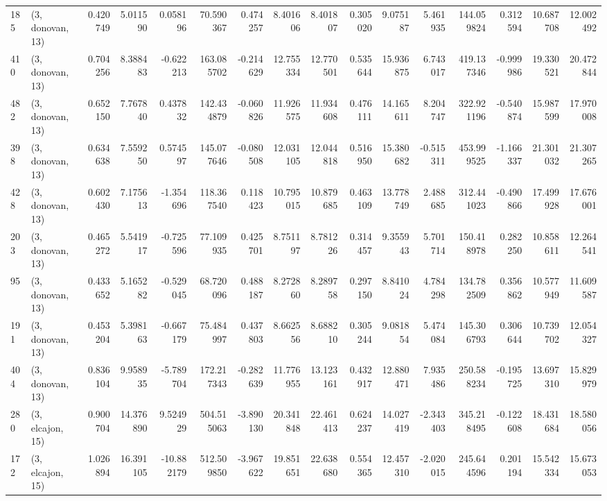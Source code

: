 \begin{tabular}{llrrrrrrrrrrrrrr}
185 &  (3, donovan, 13) &   0.420749 &   5.011590 &   0.058196 &    70.590367 &   0.474257 &   8.401606 &   8.401807 &  0.305020 &   9.075187 &   5.461935 &   144.059824 &  0.312594 &  10.687708 &  12.002492 \\
410 &  (3, donovan, 13) &   0.704256 &   8.388483 &  -0.622213 &   163.085702 &  -0.214629 &  12.755334 &  12.770501 &  0.535644 &  15.936875 &   6.743017 &   419.137346 & -0.999986 &  19.330521 &  20.472844 \\
482 &  (3, donovan, 13) &   0.652150 &   7.767840 &   0.437832 &   142.434879 &  -0.060826 &  11.926575 &  11.934608 &  0.476111 &  14.165611 &   8.204747 &   322.921196 & -0.540874 &  15.987599 &  17.970008 \\
398 &  (3, donovan, 13) &   0.634638 &   7.559250 &   0.574597 &   145.077646 &  -0.080508 &  12.031105 &  12.044818 &  0.516950 &  15.380682 &  -0.515311 &   453.999525 & -1.166337 &  21.301032 &  21.307265 \\
428 &  (3, donovan, 13) &   0.602430 &   7.175613 &  -1.354696 &   118.367540 &   0.118423 &  10.795015 &  10.879685 &  0.463109 &  13.778749 &   2.488685 &   312.441023 & -0.490866 &  17.499928 &  17.676001 \\
203 &  (3, donovan, 13) &   0.465272 &   5.541917 &  -0.725596 &    77.109935 &   0.425701 &   8.751197 &   8.781226 &  0.314457 &   9.355943 &   5.701714 &   150.418978 &  0.282250 &  10.858611 &  12.264541 \\
95  &  (3, donovan, 13) &   0.433652 &   5.165282 &  -0.529045 &    68.720096 &   0.488187 &   8.272860 &   8.289758 &  0.297150 &   8.841024 &   4.784298 &   134.782509 &  0.356862 &  10.577949 &  11.609587 \\
191 &  (3, donovan, 13) &   0.453204 &   5.398163 &  -0.667179 &    75.484997 &   0.437803 &   8.662556 &   8.688210 &  0.305244 &   9.081854 &   5.474084 &   145.306793 &  0.306644 &  10.739702 &  12.054327 \\
404 &  (3, donovan, 13) &   0.836104 &   9.958935 &  -5.789704 &   172.217343 &  -0.282639 &  11.776955 &  13.123161 &  0.432917 &  12.880471 &   7.935486 &   250.588234 & -0.195725 &  13.697310 &  15.829979 \\
280 &  (3, elcajon, 15) &   0.900704 &  14.376890 &   9.524929 &   504.515063 &  -3.890130 &  20.341848 &  22.461413 &  0.624237 &  14.027419 &  -2.343403 &   345.218495 & -0.122608 &  18.431684 &  18.580056 \\
172 &  (3, elcajon, 15) &   1.026894 &  16.391105 & -10.882179 &   512.509850 &  -3.967622 &  19.851651 &  22.638680 &  0.554365 &  12.457310 &  -2.020015 &   245.644596 &  0.201194 &  15.542334 &  15.673053 \\

\end{tabular}
